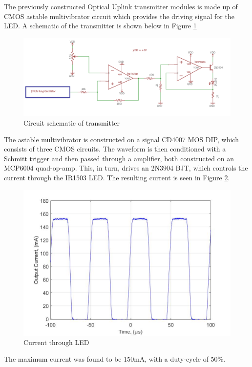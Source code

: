 

The previously constructed Optical Uplink transmitter modules is made up of CMOS astable multivibrator circuit which provides the driving signal for the LED. A schematic of the transmitter is shown below in Figure \ref{fig:finalexperimentalschem}

\begin{figure}[H]
	\centering
	\includegraphics[width=0.7\linewidth]{Preliminary_results/FINAlexperimentalSchem}
	\caption{Circuit schematic of transmitter}
	\label{fig:finalexperimentalschem}
\end{figure}

The astable multivibrator is constructed on a signal CD4007 MOS DIP, which consists of three CMOS circuits. The waveform is then conditioned with a Schmitt trigger and then passed through a amplifier, both constructed on an MCP6004 quad-op-amp. This, in turn, drives an 2N3904 BJT, which controls the current through the IR1503 LED. The resulting current is seen in Figure \ref{fig:expcurrentlab4}.

\begin{figure}[H]
	\centering
	\includegraphics[width=0.7\linewidth]{Preliminary_results/expcurrentlab4}
	\caption{Current through LED}
	\label{fig:expcurrentlab4}
\end{figure}

The maximum current was found to be 150mA, with a duty-cycle of 50\%. 


	
